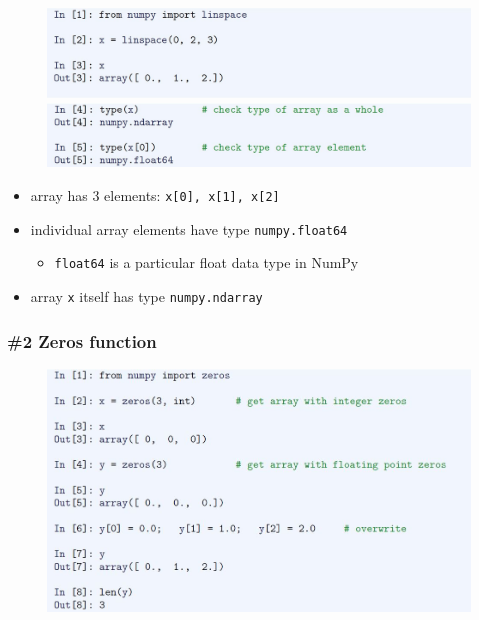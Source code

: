 \documentclass[14pt]{beamer}
\begin{document}
\begin{frame}[fragile]

\frametitle{}

\begin{figure}[ht]
	\centering
	\includegraphics[width=\textwidth]{figures/LLp47}
	\includegraphics[width=\textwidth]{figures/LLp48}
\end{figure}

\vspace*{-4mm}
	
\begin{itemize}
	\item array has $3$ elements: \texttt{x[0], x[1], x[2]}
	\item individual array elements have type \texttt{numpy.float64}
	\begin{itemize}
		\item \texttt{float64} is a particular float data type in NumPy
	\end{itemize}
	\item array \texttt{x} itself has type \texttt{numpy.ndarray}

\end{itemize}

\end{frame}


\begin{frame}[fragile]

\frametitle{\#2 Zeros function}

\begin{figure}[ht]
	\centering
	\includegraphics[width=\textwidth]{figures/LLp49}
\end{figure}

\end{frame}
\end{document}
